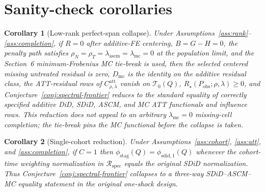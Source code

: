 \documentclass[11pt]{article}
\theoremstyle{definition}
\theoremstyle{plain}
\newtheorem{corollary}{Corollary}
\theoremstyle{remark}
\begin{document}
\section{Sanity-check corollaries}
\begin{corollary}[Low-rank perfect-span collapse]\label{cor:perfect-span}
Under Assumptions~\ref{ass:rank}--\ref{ass:completion}, if \(R=0\) after additive-FE centering, \(B=G-H=0\), the penalty path satisfies \(\rho_N=\rho_T=\lambda_{\mathrm{ascm}}=\lambda_{\mathrm{mc}}=0\) at the population limit, and the Section~6 minimum-Frobenius MC tie-break is used, then the selected centered missing untreated residual is zero, \(D_{\mathrm{mc}}\) is the identity on the additive residual class, the ATT-residual rows of \(C^{\mathrm{att}}_{\rho,\lambda}\) vanish on \(\mathcal T_0(Q)\), \(R_\star(P_{\mathrm{obs}};\rho,\lambda)\ge 0\), and Conjecture~\ref{conj:spectral-frontier} reduces to the standard equality of correctly specified additive DiD, SDiD, ASCM, and MC ATT functionals and influence rows.  This reduction does not appeal to an arbitrary \(\lambda_{\mathrm{mc}}=0\) missing-cell completion; the tie-break pins the MC functional before the collapse is taken.
\end{corollary}

\begin{corollary}[Single-cohort reduction]\label{cor:single-cohort}
Under Assumptions~\ref{ass:cohort}, \ref{ass:att}, and \ref{ass:completion}, if \(C=1\) then \(\phi_{\mathrm{stag}}(Q)=\phi_{\mathrm{sdid},1}(Q)\) whenever the cohort-time weighting normalization in \(\mathcal R_{\mathrm{spec}}\) equals the original SDiD normalization.  Thus Conjecture~\ref{conj:spectral-frontier} collapses to a three-way SDiD--ASCM--MC equality statement in the original one-shock design.
\end{corollary}
\end{document}
